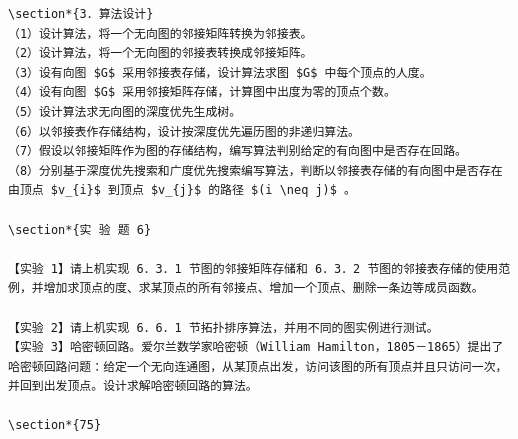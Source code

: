 \documentclass[10pt]{article}
\begin{document}
\begin{verbatim}
\section*{3．算法设计}
（1）设计算法，将一个无向图的邻接矩阵转换为邻接表。
（2）设计算法，将一个无向图的邻接表转换成邻接矩阵。
（3）设有向图 $G$ 采用邻接表存储，设计算法求图 $G$ 中每个顶点的人度。
（4）设有向图 $G$ 采用邻接矩阵存储，计算图中出度为零的顶点个数。
（5）设计算法求无向图的深度优先生成树。
（6）以邻接表作存储结构，设计按深度优先遍历图的非递归算法。
（7）假设以邻接矩阵作为图的存储结构，编写算法判别给定的有向图中是否存在回路。
（8）分别基于深度优先搜索和广度优先搜索编写算法，判断以邻接表存储的有向图中是否存在由顶点 $v_{i}$ 到顶点 $v_{j}$ 的路径 $(i \neq j)$ 。

\section*{实 验 题 6}

【实验 1】请上机实现 6．3．1 节图的邻接矩阵存储和 6．3．2 节图的邻接表存储的使用范例，并增加求顶点的度、求某顶点的所有邻接点、增加一个顶点、删除一条边等成员函数。

【实验 2】请上机实现 6．6．1 节拓扑排序算法，并用不同的图实例进行测试。
【实验 3】哈密顿回路。爱尔兰数学家哈密顿（William Hamilton，1805－1865）提出了哈密顿回路问题：给定一个无向连通图，从某顶点出发，访问该图的所有顶点并且只访问一次，并回到出发顶点。设计求解哈密顿回路的算法。

\section*{75}


\end{verbatim}
\end{document}
